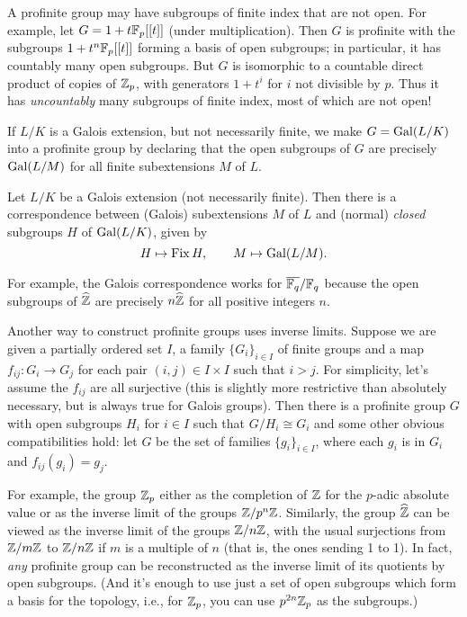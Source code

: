A profinite group may have subgroups of finite index that are
not open. For example, let $G = 1 + t \mathbb{F}_p [[ t ]]$
(under multiplication). Then $G$ is profinite with the subgroups
$1 + t^n \mathbb{F}_p [[ t ]]$ forming a basis of open
subgroups; in particular, it has countably many open subgroups.
But $G$ is isomorphic to a countable direct product of
copies of $\mathbb{Z}_p$, with generators $1 + t^{i}$ for $i$ not divisible by $p$.
Thus it has \emph{uncountably} many subgroups of finite index, most
of which are not open!

If $L/K$ is a Galois extension, but not necessarily finite, we make
$G = \operatorname{Gal}(L/K)$ into a profinite group by declaring that the open subgroups
of $G$ are precisely $\operatorname{Gal}(L/M)$ for all finite subextensions $M$ of $L$.

\begin{theorem}
  Let $L/K$ be a Galois extension (not necessarily finite). Then
there is a correspondence between (Galois) subextensions $M$ of $L$ and
(normal) \emph{closed} subgroups $H$ of $\operatorname{Gal}(L/K)$, given by
\[
H \mapsto \operatorname{Fix} H, \qquad M \mapsto \operatorname{Gal}(L/M).
\]
\end{theorem}
For example, the Galois correspondence works for $\overline{\mathbb{F}_q}/\mathbb{F}_q$
because the open subgroups of $\widehat{\mathbb{Z}}$ are precisely
$n\widehat{\mathbb{Z}}$ for all positive integers $n$.

Another way to construct profinite groups uses inverse limits. Suppose we
are given a partially ordered set $I$, a
family $\{G_i\}_{i \in I}$ of finite groups and a map $f_{ij}: G_i \to G_j$
for each pair $(i,j) \in I \times I$ such that $i > j$. For simplicity,
let's assume the $f_{ij}$ are all surjective (this is slightly more restrictive than absolutely necessary, but is always true for Galois groups). Then there is
a profinite group $G$ with open subgroups $H_i$ for $i \in I$ such that
$G/H_i \cong G_i$ and some other obvious compatibilities hold:
let $G$ be the set of families $\{g_i\}_{i \in I}$, where each $g_i$
is in $G_i$ and $f_{ij}(g_i) = g_j$.

For example, the group $\mathbb{Z}_p$ either as the completion of $\mathbb{Z}$ for the $p$-adic absolute value or as the inverse limit of the groups $\mathbb{Z}/p^n\mathbb{Z}$.
Similarly, the group $\widehat{\mathbb{Z}}$ can be viewed as the inverse limit
of the groups $\mathbb{Z}/n\mathbb{Z}$, with the usual surjections from $\mathbb{Z}/m\mathbb{Z}$
to $\mathbb{Z}/n\mathbb{Z}$ if $m$ is a multiple of $n$ (that is, the ones sending 1 to 1).
In fact, \emph{any} profinite group can be reconstructed as the inverse
limit of its quotients by open subgroups. (And it's enough to use just a
set of open subgroups which form a basis for the topology, i.e.,
for $\mathbb{Z}_p$, you can use $p^{2n}\mathbb{Z}_p$ as the subgroups.)

